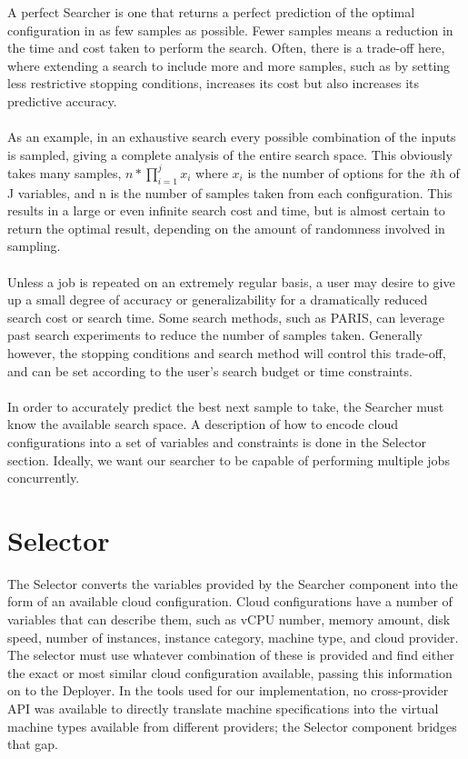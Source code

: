 \documentclass{report}
\begin{document}
A perfect Searcher is one that returns a perfect prediction of the optimal configuration in as few samples as possible. Fewer samples means a reduction in the time and cost taken to perform the search. Often, there is a trade-off here, where extending a search to include more and more samples, such as by setting less restrictive stopping conditions, increases its cost but also increases its predictive accuracy.

\paragraph{}
As an example, in an exhaustive search every possible combination of the inputs is sampled, giving a complete analysis of the entire search space. This obviously takes many samples, $n * \prod_{i=1}^{j} x_{i}$ where $x_{i}$ is the number of options for the \textit{i}th of J variables, and n is the number of samples taken from each configuration. This results in a large or even infinite search cost and time, but is almost certain to return the optimal result, depending on the amount of randomness involved in sampling.

\paragraph{}
Unless a job is repeated on an extremely regular basis, a user may desire to give up a small degree of accuracy or generalizability for a dramatically reduced search cost or search time. Some search methods, such as PARIS\cite{Yadwadkar2017}, can leverage past search experiments to reduce the number of samples taken. Generally however, the stopping conditions and search method will control this trade-off, and can be set according to the user's search budget or time constraints. 

\paragraph{}
In order to accurately predict the best next sample to take, the Searcher must know the available search space.  A description of how to encode cloud configurations into a set of variables and constraints is done in the Selector section. Ideally, we want our searcher to be capable of performing multiple jobs concurrently.

\section{Selector}
The Selector converts the variables provided by the Searcher component into the form of an available cloud configuration. Cloud configurations have a number of variables that can describe them, such as vCPU number, memory amount, disk speed, number of instances, instance category, machine type, and cloud provider. The selector must use whatever combination of these is provided and find either the exact or most similar cloud configuration available, passing this information on to the Deployer. In the tools used for our implementation, no cross-provider API was available to directly translate machine specifications into the virtual machine types available from different providers; the Selector component bridges that gap.
\end{document}
